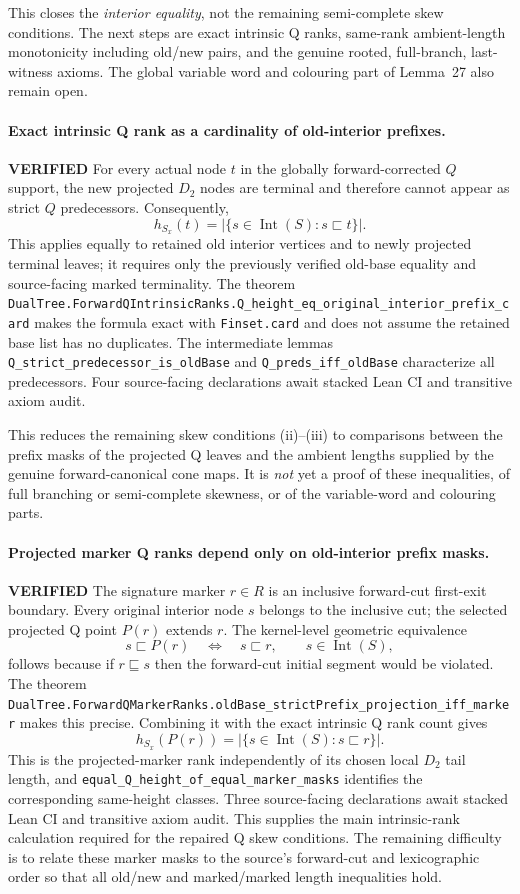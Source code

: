 \documentclass[11pt]{article}
\newcommand{\ok}{\textcolor{green!40!black}{\textbf{VERIFIED}}}
\newcommand{\lean}[1]{\texttt{#1}}
\begin{document}
This closes the \emph{interior equality}, not
the remaining semi-complete skew conditions.
The next steps are exact intrinsic Q ranks,
same-rank ambient-length monotonicity
including old/new pairs, and the genuine
rooted, full-branch, last-witness axioms.
The global variable word and colouring
part of Lemma~27 also remain open.

\paragraph{Exact intrinsic Q rank as a cardinality of old-interior prefixes.} \ok
For every actual node $t$ in the globally
forward-corrected $Q$ support, the new projected
$D_2$ nodes are terminal and therefore cannot
appear as strict $Q$ predecessors. Consequently,
\[
 h_{S_x}(t)=
 \left|\{s\in\operatorname{Int}(S):s\sqsubset t\}\right|.
\]
This applies equally to retained old interior
vertices and to newly projected terminal leaves;
it requires only the previously verified
old-base equality and source-facing marked
terminality. The theorem
\lean{DualTree.ForwardQIntrinsicRanks.Q_height_eq_original_interior_prefix_card}
makes the formula exact with \texttt{Finset.card}
and does not assume the retained base list has
no duplicates. The intermediate lemmas
\lean{Q_strict_predecessor_is_oldBase} and
\lean{Q_preds_iff_oldBase} characterize all
predecessors. Four source-facing declarations
await stacked Lean CI and transitive axiom
audit.

This reduces the remaining skew conditions
(ii)--(iii) to comparisons between the
prefix masks of the projected Q leaves
and the ambient lengths supplied by the
genuine forward-canonical cone maps.
It is \emph{not} yet a proof of these
inequalities, of full branching or
semi-complete skewness, or of the
variable-word and colouring parts.

\paragraph{Projected marker Q ranks depend only on old-interior prefix masks.} \ok
The signature marker $r\in R$ is an inclusive
forward-cut first-exit boundary. Every original
interior node $s$ belongs to the inclusive cut;
the selected projected Q point $P(r)$ extends $r$.
The kernel-level geometric equivalence
\[
 s\sqsubset P(r)\quad\Longleftrightarrow\quad
 s\sqsubset r,\qquad s\in\operatorname{Int}(S),
\]
follows because if $r\sqsubseteq s$ then the
forward-cut initial segment would be violated.
The theorem
\lean{DualTree.ForwardQMarkerRanks.oldBase_strictPrefix_projection_iff_marker}
makes this precise. Combining it with the
exact intrinsic Q rank count gives
\[
 h_{S_x}(P(r))=
   \left|\{s\in\operatorname{Int}(S):s\sqsubset r\}\right|.
\]
This is the projected-marker rank independently
of its chosen local $D_2$ tail length, and
\lean{equal_Q_height_of_equal_marker_masks}
identifies the corresponding same-height
classes. Three source-facing declarations
await stacked Lean CI and transitive axiom
audit. This supplies the main intrinsic-rank
calculation required for the repaired Q skew
conditions. The remaining difficulty is to
relate these marker masks to the source's
forward-cut and lexicographic order so that
all old/new and marked/marked length
inequalities hold.
\end{document}
